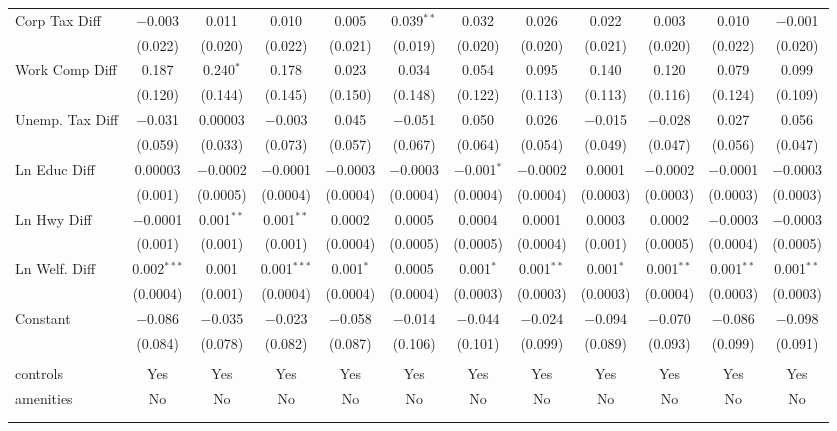 \begin{table}[!htbp]
\begin{tabular}{@{\extracolsep{5pt}}lccccccccccc}
  Corp Tax Diff & $-$0.003 & 0.011 & 0.010 & 0.005 & 0.039$^{**}$ & 0.032 & 0.026 & 0.022 & 0.003 & 0.010 & $-$0.001 \\ 
  & (0.022) & (0.020) & (0.022) & (0.021) & (0.019) & (0.020) & (0.020) & (0.021) & (0.020) & (0.022) & (0.020) \\ 
  Work Comp Diff & 0.187 & 0.240$^{*}$ & 0.178 & 0.023 & 0.034 & 0.054 & 0.095 & 0.140 & 0.120 & 0.079 & 0.099 \\ 
  & (0.120) & (0.144) & (0.145) & (0.150) & (0.148) & (0.122) & (0.113) & (0.113) & (0.116) & (0.124) & (0.109) \\ 
  Unemp. Tax Diff & $-$0.031 & 0.00003 & $-$0.003 & 0.045 & $-$0.051 & 0.050 & 0.026 & $-$0.015 & $-$0.028 & 0.027 & 0.056 \\ 
  & (0.059) & (0.033) & (0.073) & (0.057) & (0.067) & (0.064) & (0.054) & (0.049) & (0.047) & (0.056) & (0.047) \\ 
  Ln Educ Diff & 0.00003 & $-$0.0002 & $-$0.0001 & $-$0.0003 & $-$0.0003 & $-$0.001$^{*}$ & $-$0.0002 & 0.0001 & $-$0.0002 & $-$0.0001 & $-$0.0003 \\ 
  & (0.001) & (0.0005) & (0.0004) & (0.0004) & (0.0004) & (0.0004) & (0.0004) & (0.0003) & (0.0003) & (0.0003) & (0.0003) \\ 
  Ln Hwy Diff & $-$0.0001 & 0.001$^{**}$ & 0.001$^{**}$ & 0.0002 & 0.0005 & 0.0004 & 0.0001 & 0.0003 & 0.0002 & $-$0.0003 & $-$0.0003 \\ 
  & (0.001) & (0.001) & (0.001) & (0.0004) & (0.0005) & (0.0005) & (0.0004) & (0.001) & (0.0005) & (0.0004) & (0.0005) \\ 
  Ln Welf. Diff & 0.002$^{***}$ & 0.001 & 0.001$^{***}$ & 0.001$^{*}$ & 0.0005 & 0.001$^{*}$ & 0.001$^{**}$ & 0.001$^{*}$ & 0.001$^{**}$ & 0.001$^{**}$ & 0.001$^{**}$ \\ 
  & (0.0004) & (0.001) & (0.0004) & (0.0004) & (0.0004) & (0.0003) & (0.0003) & (0.0003) & (0.0004) & (0.0003) & (0.0003) \\ 
  Constant & $-$0.086 & $-$0.035 & $-$0.023 & $-$0.058 & $-$0.014 & $-$0.044 & $-$0.024 & $-$0.094 & $-$0.070 & $-$0.086 & $-$0.098 \\ 
  & (0.084) & (0.078) & (0.082) & (0.087) & (0.106) & (0.101) & (0.099) & (0.089) & (0.093) & (0.099) & (0.091) \\ 
 \hline \\[-1.8ex] 
controls & Yes & Yes & Yes & Yes & Yes & Yes & Yes & Yes & Yes & Yes & Yes \\ 
amenities & No & No & No & No & No & No & No & No & No & No & No \\ 
\hline \\[-1.8ex] 
\hline 
\hline \\[-1.8ex] 
\end{tabular} 
\end{table} 
